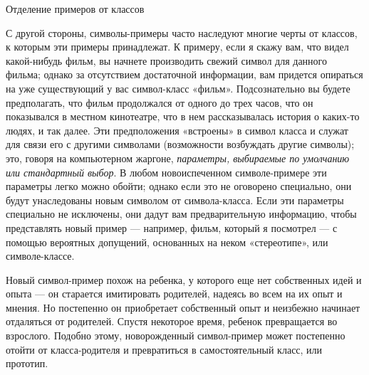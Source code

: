 \documentclass[../main.tex]{subfiles}
\begin{document}
Отделение примеров от классов

С другой стороны, символы-примеры часто наследуют многие черты от классов, к которым эти примеры принадлежат. К примеру, если я скажу вам, что видел какой-нибудь фильм, вы начнете производить свежий символ для данного фильма; однако за отсутствием достаточной информации, вам придется опираться на уже существующий у вас символ-класс «фильм». Подсознательно вы будете предполагать, что фильм продолжался от одного до трех часов, что он показывался в местном кинотеатре, что в нем рассказывалась история о каких-то людях, и так далее. Эти предположения «встроены» в символ класса и служат для связи его с другими символами (возможности возбуждать другие символы); это, говоря на компьютерном жаргоне, \emph{параметры, выбираемые по умолчанию или стандартный выбор}. В любом новоиспеченном символе-примере эти параметры легко можно обойти; однако если это не оговорено специально, они будут унаследованы новым символом от символа-класса. Если эти параметры специально не исключены, они дадут вам предварительную информацию, чтобы представлять новый пример --- например, фильм, который я посмотрел --- с помощью вероятных допущений, основанных на неком «стереотипе», или символе-классе.

Новый символ-пример похож на ребенка, у которого еще нет собственных идей и опыта --- он старается имитировать родителей, надеясь во всем на их опыт и мнения. Но постепенно он приобретает собственный опыт и неизбежно начинает отдаляться от родителей. Спустя некоторое время, ребенок превращается во взрослого. Подобно этому, новорожденный символ-пример может постепенно отойти от класса-родителя и превратиться в самостоятельный класс, или прототип.
\end{document}
